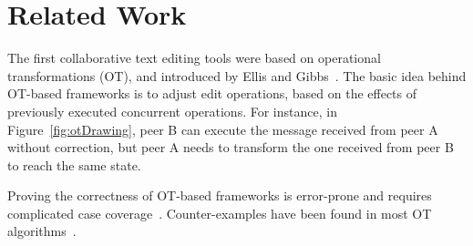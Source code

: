 \documentclass[11pt,a4paper]{article}
\begin{document}
\section{Related Work}%
\label{sec:relatedWork}%
The first collaborative text editing tools were based on operational transformations (OT), and introduced by Ellis and Gibbs~\cite{ellis1989concurrency}.
The basic idea behind OT-based frameworks is to adjust edit operations, based on the effects of previously executed concurrent operations.
For instance, in Figure~\ref{fig:otDrawing}, peer B can execute the message received from peer A without correction, but peer A needs to transform the one received from peer B to reach the same state.

Proving the correctness of OT-based frameworks is error-prone and requires complicated case coverage~\cite{li2010admissibility,molli2006tombstone}.
Counter-examples have been found in most OT algorithms~\cite{roh2009optimistic}\cite[section 8.2]{gomes2017verifying}.
\end{document}
